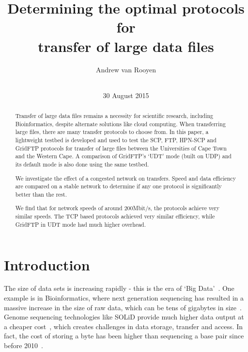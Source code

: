 \documentclass{sig-alternate-05-2015}
\begin{document}
\title{Determining the optimal protocols for\\transfer of large data files}

\author{
\alignauthor Andrew van Rooyen\\
\\
}

\date{30 August 2015}


\maketitle
\begin{abstract}
	Transfer of large data files remains a necessity for scientific research, including Bioinformatics, despite alternate solutions like cloud computing. When transferring large files, there are many transfer protocols to choose from. In this paper, a lightweight testbed is developed and used to test the SCP, FTP, HPN-SCP and GridFTP protocols for transfer of large files between the Universities of Cape Town and the Western Cape.
A comparison of GridFTP's `UDT' mode (built on UDP) and its default mode is also done using the same testbed.

We investigate the effect of a congested network on transfers. Speed and data efficiency are compared on a stable network to determine if any one protocol is significantly better than the rest.

We find that for network speeds of around 200Mbit/s, the protocols achieve very similar speeds. The TCP based protocols achieved very similar efficiency, while GridFTP in UDT mode had much higher overhead.
\end{abstract}

\section{Introduction}
The size of data sets is increasing rapidly - this is the era of `Big Data'~\cite{manyika2011big}. One example is in Bioinformatics, where next generation sequencing has resulted in a massive increase in the size of raw data, which can be tens of gigabytes in size~\cite{deorowicz2011compression}. Genome sequencing technologies like SOLiD provide much higher data output at a cheaper cost~\cite{shendure2008next}, which creates challenges in data storage, transfer and access. In fact, the cost of storing a byte has been higher than sequencing a base pair since before 2010~\cite{baker2010next}.
\end{document}
